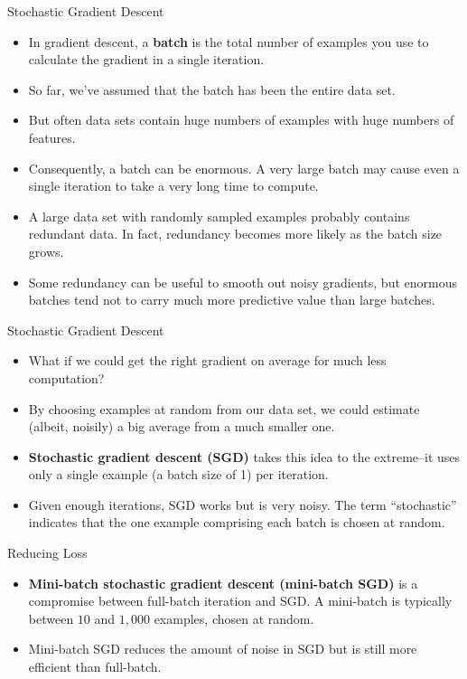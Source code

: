 \documentclass{beamer}
\begin{document}
\begin{frame}{Stochastic Gradient Descent}


\begin{itemize}
\item In gradient descent, a {\bf batch} is the total number of examples you use to calculate the gradient in a single iteration. 
    \item So far, we've assumed that the batch has been the entire data set. 
    \item But often data sets contain huge numbers of examples with huge numbers of features.
    \item Consequently, a batch can be enormous. A very large batch may cause even a single iteration to take a very long time to compute.
    \item A large data set with randomly sampled examples probably contains redundant data. In fact, redundancy becomes more likely as the batch size grows. 
    \item Some redundancy can be useful to smooth out noisy gradients, but enormous batches tend not to carry much more predictive value than large batches.
\end{itemize}
\end{frame}

\begin{frame}{Stochastic Gradient Descent}

\begin{itemize}
\item What if we could get the right gradient on average for much less computation? 

\medskip
\item By choosing examples at random from our data set, we could estimate (albeit, noisily) a big average from a much smaller one. 

\medskip
\item {\bf Stochastic gradient descent (SGD)} takes this idea to the extreme--it uses only a single example (a batch size of 1) per iteration. 

\medskip
\item Given enough iterations, SGD works but is very noisy. The term ``stochastic'' indicates that the one example comprising each batch is chosen at random.
\end{itemize}

\end{frame}

\begin{frame}{Reducing Loss}
\begin{itemize}
    \item {\bf Mini-batch stochastic gradient descent (mini-batch SGD)} is a compromise between full-batch iteration and SGD. A mini-batch is typically between $10$ and $1,000$ examples, chosen at random. 
    
\medskip
\item Mini-batch SGD reduces the amount of noise in SGD but is still more efficient than full-batch.
\end{itemize}
\end{frame}
\end{document}
